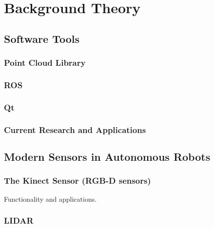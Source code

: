 \chapter{Background Theory}
\label{chp:theory} 

\section{Software Tools}

\subsection{Point Cloud Library}

\subsection{ROS}

\subsection{Qt}

\subsection{Current Research and Applications}

\section{Modern Sensors in Autonomous Robots}

\subsection{The Kinect Sensor (RGB-D sensors)}
Functionality and applications.

\subsection{LIDAR}



